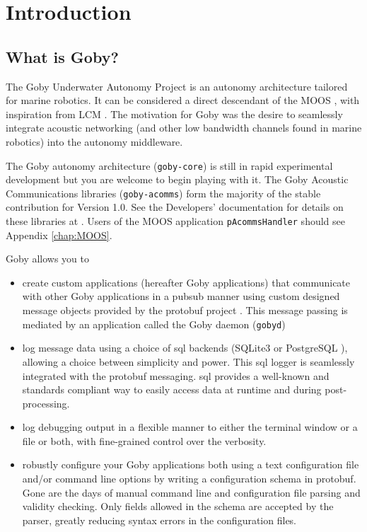 \chapter{Introduction}

\section{What is Goby?}

The Goby Underwater Autonomy Project is an \gls{autonomy architecture} tailored for marine robotics. It can be considered a direct descendant of the MOOS \cite{moos}, with inspiration from LCM \cite{lcm}. The motivation for Goby was the desire to seamlessly integrate \gls{acoustic networking} (and other low bandwidth channels found in marine robotics) into the autonomy middleware. 

The Goby autonomy architecture (\verb|goby-core|) is still in rapid experimental development but you are welcome to begin playing with it. The Goby Acoustic Communications libraries (\verb|goby-acomms|) form the majority of the stable contribution for Version 1.0. See the Developers' documentation for details on these libraries at \cite{goby-doc}. Users of the MOOS application \verb|pAcommsHandler| should see Appendix \ref{chap:MOOS}.

Goby allows you to
\begin{itemize}
\item create custom \glspl{application} (hereafter Goby applications) that communicate with other Goby applications in a \gls{pubsub} manner using custom designed message objects provided by the \gls{protobuf} project \cite{protobuf}. This message passing is mediated by an application called the Goby \gls{daemon} (\verb|gobyd|)
\item log message data using a choice of \gls{sql} backends (SQLite3 \cite{sqlite} or PostgreSQL \cite{postgres}), allowing a choice between simplicity and power. This \gls{sql} logger is seamlessly integrated with the \gls{protobuf} messaging. \gls{sql} provides a well-known and standards compliant way to easily access data at runtime and during post-processing.
\item log debugging output in a flexible manner to either the terminal window or a file or both, with fine-grained control over the verbosity.
\item robustly configure your Goby applications both using a text configuration file and/or command line options by writing a configuration schema in \gls{protobuf}. Gone are the days of manual command line and configuration file parsing and validity checking. Only fields allowed in the schema are accepted by the parser, greatly reducing syntax errors in the configuration files.
\end{itemize}

